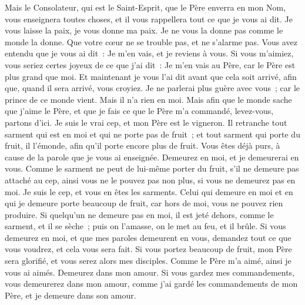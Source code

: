 \begin{multicols}{2}
Mais le Consolateur, qui est le Saint-Esprit, que le Père enverra en mon Nom, vous enseignera toutes choses, et il vous rappellera tout ce que je vous ai dit.
Je vous laisse la paix, je vous donne ma paix. Je ne vous la donne pas comme le monde la donne. Que votre cœur ne se trouble pas, et ne s'alarme pas.
Vous avez entendu que je vous ai dit~: Je m'en vais, et je reviens à vous. Si vous m'aimiez, vous seriez certes joyeux de ce que j'ai dit~: Je m'en vais au Père, car le Père est plus grand que moi.
Et maintenant je vous l'ai dit avant que cela soit arrivé, afin que, quand il sera arrivé, vous croyiez.
Je ne parlerai plus guère avec vous~; car le prince de ce monde vient. Mais il n'a rien en moi.
Mais afin que le monde sache que j'aime le Père, et que je fais ce que le Père m'a commandé, levez-vous, partons d'ici.
\VerseOne{}Je suis le vrai cep, et mon Père est le vigneron.
Il retranche tout sarment qui est en moi et qui ne porte pas de fruit~; et tout sarment qui porte du fruit, il l'émonde, afin qu'il porte encore plus de fruit.
Vous êtes déjà purs, à cause de la parole que je vous ai enseignée.
Demeurez en moi, et je demeurerai en vous. Comme le sarment ne peut de lui-même porter du fruit, s'il ne demeure pas attaché au cep, ainsi vous ne le pouvez pas non plus, si vous ne demeurez pas en moi.
Je suis le cep, et vous en êtes les sarments. Celui qui demeure en moi et en qui je demeure porte beaucoup de fruit, car hors de moi, vous ne pouvez rien produire.
Si quelqu'un ne demeure pas en moi, il est jeté dehors, comme le sarment, et il se sèche~; puis on l'amasse, on le met au feu, et il brûle.
Si vous demeurez en moi, et que mes paroles demeurent en vous, demandez tout ce que vous voudrez, et cela vous sera fait.
Si vous portez beaucoup de fruit, mon Père sera glorifié, et vous serez alors mes disciples.
Comme le Père m'a aimé, ainsi je vous ai aimés. Demeurez dans mon amour.
Si vous gardez mes commandements, vous demeurerez dans mon amour, comme j'ai gardé les commandements de mon Père, et je demeure dans son amour.

\end{multicols}
